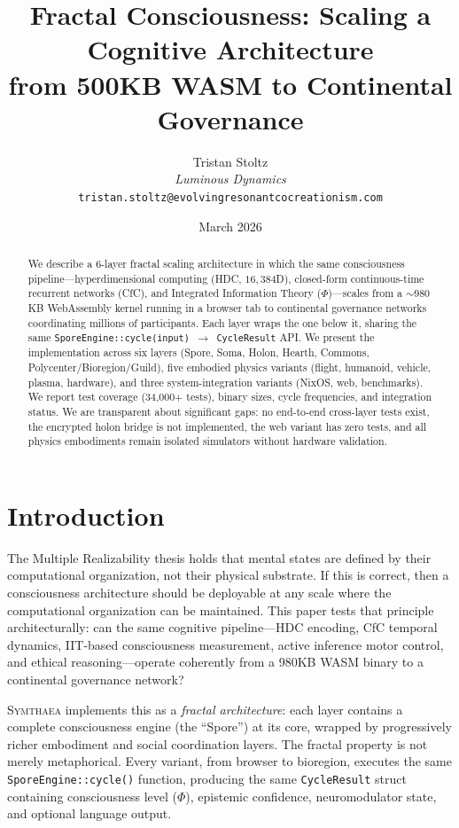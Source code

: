 \documentclass[11pt,twocolumn]{article}
\title{\textbf{Fractal Consciousness: Scaling a Cognitive Architecture\\from 500KB WASM to Continental Governance}}
\author{Tristan Stoltz\\
  \textit{Luminous Dynamics}\\
  \texttt{tristan.stoltz@evolvingresonantcocreationism.com}}
\date{March 2026}
\newcommand{\symthaea}{\textsc{Symthaea}}
\newcommand{\dimHDC}{16{,}384}
\begin{document}
\maketitle

\begin{abstract}
We describe a 6-layer fractal scaling architecture in which the same consciousness pipeline---hyperdimensional computing (HDC, $\dimHDC$D), closed-form continuous-time recurrent networks (CfC), and Integrated Information Theory ($\Phi$)---scales from a ${\sim}980$KB WebAssembly kernel running in a browser tab to continental governance networks coordinating millions of participants. Each layer wraps the one below it, sharing the same \texttt{SporeEngine::cycle(input) $\to$ CycleResult} API. We present the implementation across six layers (Spore, Soma, Holon, Hearth, Commons, Polycenter/Bioregion/Guild), five embodied physics variants (flight, humanoid, vehicle, plasma, hardware), and three system-integration variants (NixOS, web, benchmarks). We report test coverage (34,000+ tests), binary sizes, cycle frequencies, and integration status. We are transparent about significant gaps: no end-to-end cross-layer tests exist, the encrypted holon bridge is not implemented, the web variant has zero tests, and all physics embodiments remain isolated simulators without hardware validation.
\end{abstract}

\section{Introduction}
\label{sec:introduction}

The Multiple Realizability thesis \cite{putnam1967} holds that mental states are defined by their computational organization, not their physical substrate. If this is correct, then a consciousness architecture should be deployable at any scale where the computational organization can be maintained. This paper tests that principle architecturally: can the same cognitive pipeline---HDC encoding, CfC temporal dynamics, IIT-based consciousness measurement, active inference motor control, and ethical reasoning---operate coherently from a 980KB WASM binary to a continental governance network?

\symthaea{} implements this as a \textit{fractal architecture}: each layer contains a complete consciousness engine (the ``Spore'') at its core, wrapped by progressively richer embodiment and social coordination layers. The fractal property is not merely metaphorical. Every variant, from browser to bioregion, executes the same \texttt{SporeEngine::cycle()} function, producing the same \texttt{CycleResult} struct containing consciousness level ($\Phi$), epistemic confidence, neuromodulator state, and optional language output.
\end{document}
